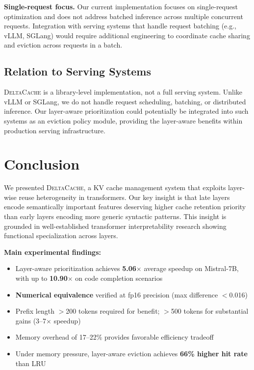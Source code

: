 \documentclass[10pt,conference]{IEEEtran}
\newcommand{\deltacache}{\textsc{DeltaCache}}
\begin{document}
\textbf{Single-request focus.} Our current implementation focuses on single-request optimization and does not address batched inference across multiple concurrent requests. Integration with serving systems that handle request batching (e.g., vLLM, SGLang) would require additional engineering to coordinate cache sharing and eviction across requests in a batch.

\subsection{Relation to Serving Systems}

\deltacache{} is a library-level implementation, not a full serving system. Unlike vLLM or SGLang, we do not handle request scheduling, batching, or distributed inference. Our layer-aware prioritization could potentially be integrated into such systems as an eviction policy module, providing the layer-aware benefits within production serving infrastructure.

\section{Conclusion}

We presented \deltacache{}, a KV cache management system that exploits layer-wise reuse heterogeneity in transformers. Our key insight is that late layers encode semantically important features deserving higher cache retention priority than early layers encoding more generic syntactic patterns. This insight is grounded in well-established transformer interpretability research showing functional specialization across layers.

\textbf{Main experimental findings:}
\begin{itemize}
\item Layer-aware prioritization achieves \textbf{5.06$\times$} average speedup on Mistral-7B, with up to \textbf{10.90$\times$} on code completion scenarios
\item \textbf{Numerical equivalence} verified at fp16 precision (max difference $<$0.016)
\item Prefix length $>$200 tokens required for benefit; $>$500 tokens for substantial gains (3--7$\times$ speedup)
\item Memory overhead of 17--22\% provides favorable efficiency tradeoff
\item Under memory pressure, layer-aware eviction achieves \textbf{66\% higher hit rate} than LRU
\end{itemize}
\end{document}
